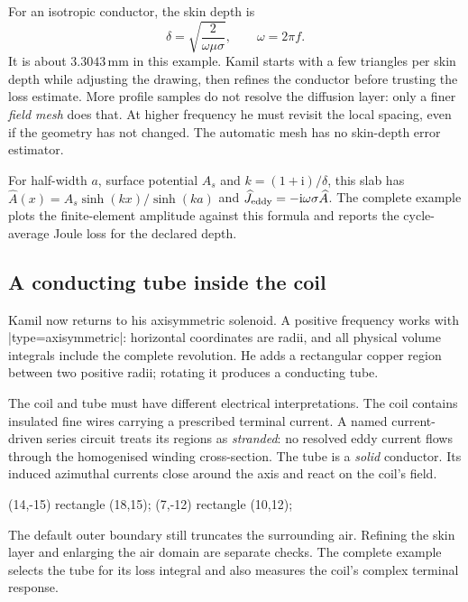For an isotropic conductor, the skin depth is
\[
 \delta=\sqrt{\frac{2}{\omega\mu\sigma}},\qquad \omega=2\pi f.
\]
It is about $3.3043\,\mathrm{mm}$ in this example. Kamil starts with a few
triangles per skin depth while adjusting the drawing, then refines the
conductor before trusting the loss estimate. More profile samples do not
resolve the diffusion layer: only a finer \emph{field mesh} does that.
At higher frequency he must revisit the local spacing, even if the geometry
has not changed. The automatic mesh has no skin-depth error estimator.

For half-width $a$, surface potential $A_s$ and $k=(1+\mathrm{i})/\delta$,
this slab has $\widehat A(x)=A_s\sinh(kx)/\sinh(ka)$ and
$\widehat J_{\rm eddy}=-\mathrm{i}\omega\sigma\widehat A$.
The complete example plots the finite-element amplitude against this formula
and reports the cycle-average Joule loss for the declared depth.

\subsection{A conducting tube inside the coil}
Kamil now returns to his axisymmetric solenoid. A positive frequency works with
|type=axisymmetric|: horizontal coordinates are radii, and all physical volume
integrals include the complete revolution. He adds a rectangular copper region
between two positive radii; rotating it produces a conducting tube.

The coil and tube must have different electrical interpretations. The coil
contains insulated fine wires carrying a prescribed terminal current. A named
current-driven series circuit treats its regions as \emph{stranded}: no
resolved eddy current flows through the homogenised winding cross-section.
The tube is a \emph{solid} conductor. Its induced azimuthal currents close around
the axis and react on the coil's field.
\begin{codeexample}
\fill[femm/region={material=copper,circuit=drive,
  turns=100,winding fill=.6,mesh size=1}]
  (14,-15) rectangle (18,15);
\fill[femm/region={material=copper,conductor=solid,mesh size=.5}]
  (7,-12) rectangle (10,12);
\end{codeexample}
The default outer boundary still truncates the surrounding air. Refining the
skin layer and enlarging the air domain are separate checks. The complete
example selects the tube for its loss integral and also measures the coil's
complex terminal response.

